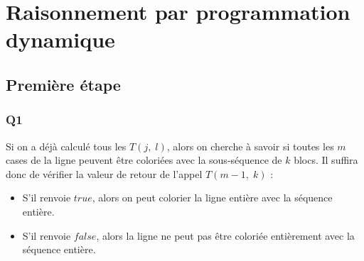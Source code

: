 \documentclass[a4paper]{memoir}
\begin{document}
	\begin{center}
	\titleM	
	\end{center}
	\clearpage
	
	\begin{center}
	\tableofcontents
	\end{center}
	
	\newpage
	\section{Raisonnement par programmation dynamique}
	\subsection{Première étape}
	\subsubsection{Q1}
	Si on a déjà calculé tous les $T(j,\; l)$, alors on cherche à savoir si toutes les $m$ cases de la ligne peuvent être coloriées avec la sous-séquence de $k$ blocs. Il suffira donc de vérifier la valeur de retour de l'appel $T(m - 1,\; k)$ :
	\begin{itemize}
	\item S'il renvoie $true$, alors on peut colorier la ligne entière avec la séquence entière.
	\item S'il renvoie $false$, alors la ligne ne peut pas être coloriée entièrement avec la séquence entière.
	\end{itemize}
	
\end{document}
